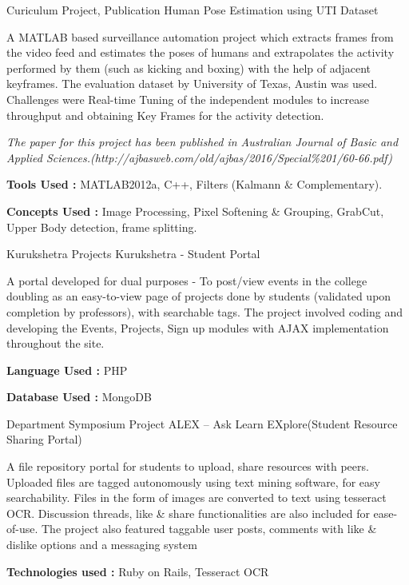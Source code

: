 \begin{cventries}
  \cventry
    {Curiculum Project, Publication} %
    {Human Pose Estimation using UTI Dataset} %
    {} %
    {} %
    {
      \begin{cvitems}
      \item{A MATLAB based surveillance automation project which extracts frames from the video feed and estimates the poses of humans and extrapolates the activity performed by them (such as kicking and boxing) with the help of   adjacent keyframes. The evaluation dataset by University of Texas, Austin was used. Challenges were Real-time   Tuning of the independent modules to increase throughput and obtaining Key Frames for the activity detection.}
      \item{\textit{The paper for this project has been published in Australian Journal of Basic and Applied Sciences.(http://ajbasweb.com/old/ajbas/2016/Special\%201/60-66.pdf)}}
      \item{\textbf{Tools Used :} MATLAB2012a, C++, Filters (Kalmann \& Complementary).}
      \item{\textbf{Concepts Used :} Image Processing, Pixel Softening \& Grouping, GrabCut, Upper Body detection, frame splitting.}
      \end{cvitems}
    }

  \cventry
    {Kurukshetra Projects} %
    {Kurukshetra - Student Portal} %
    {} %
    {} %
    {
      \begin{cvitems}
      \item{A portal developed for dual purposes - To post/view events in the college doubling as an easy-to-view page of projects done by students (validated upon completion by professors), with searchable tags. The project involved coding and developing the Events, Projects, Sign up modules with AJAX implementation throughout the site.}
      \item{\textbf{Language Used :} PHP}
      \item{\textbf{Database Used :} MongoDB}
      \end{cvitems}
    }

  \cventry
    {Department Symposium Project} %
    {ALEX – Ask Learn EXplore(Student Resource Sharing Portal)} %
    {} %
    {} %
    {
      \begin{cvitems}
      \item{A file repository portal for students to upload, share resources with peers. Uploaded files are tagged autonomously using text mining software, for easy searchability. Files in the form of images are converted to text using tesseract OCR. Discussion threads, like \& share functionalities are also included for ease-of-use. The project also featured taggable user posts, comments with like \& dislike options and a messaging system}
      \item{\textbf{Technologies used :} Ruby on Rails, Tesseract OCR}
      \end{cvitems}
    }
\end{cventries}
